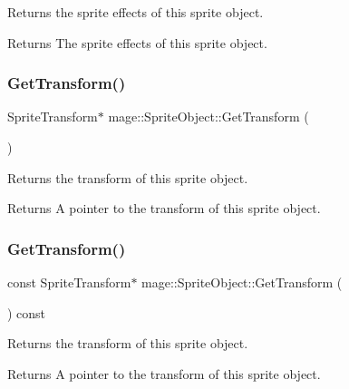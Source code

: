 Returns the sprite effects of this sprite object.

\begin{DoxyReturn}{Returns}
The sprite effects of this sprite object. 
\end{DoxyReturn}
\hypertarget{classmage_1_1_sprite_object_a709751381e87803088fc7013043bc65e}{}\label{classmage_1_1_sprite_object_a709751381e87803088fc7013043bc65e} 
\subsubsection{\texorpdfstring{Get\+Transform()}{GetTransform()}\hspace{0.1cm}{\footnotesize\ttfamily [1/2]}}
{\footnotesize\ttfamily Sprite\+Transform$\ast$ mage\+::\+Sprite\+Object\+::\+Get\+Transform (\begin{DoxyParamCaption}{ }\end{DoxyParamCaption})\hspace{0.3cm}{\ttfamily [noexcept]}}

Returns the transform of this sprite object.

\begin{DoxyReturn}{Returns}
A pointer to the transform of this sprite object. 
\end{DoxyReturn}
\hypertarget{classmage_1_1_sprite_object_ada7bf149994abd24c652b83e8f9374ec}{}\label{classmage_1_1_sprite_object_ada7bf149994abd24c652b83e8f9374ec} 
\subsubsection{\texorpdfstring{Get\+Transform()}{GetTransform()}\hspace{0.1cm}{\footnotesize\ttfamily [2/2]}}
{\footnotesize\ttfamily const Sprite\+Transform$\ast$ mage\+::\+Sprite\+Object\+::\+Get\+Transform (\begin{DoxyParamCaption}{ }\end{DoxyParamCaption}) const\hspace{0.3cm}{\ttfamily [noexcept]}}

Returns the transform of this sprite object.

\begin{DoxyReturn}{Returns}
A pointer to the transform of this sprite object. 
\end{DoxyReturn}
\hypertarget{classmage_1_1_sprite_object_a4fbb934427eee923548dd027e19dc9ba}{}\label{classmage_1_1_sprite_object_a4fbb934427eee923548dd027e19dc9ba} 
